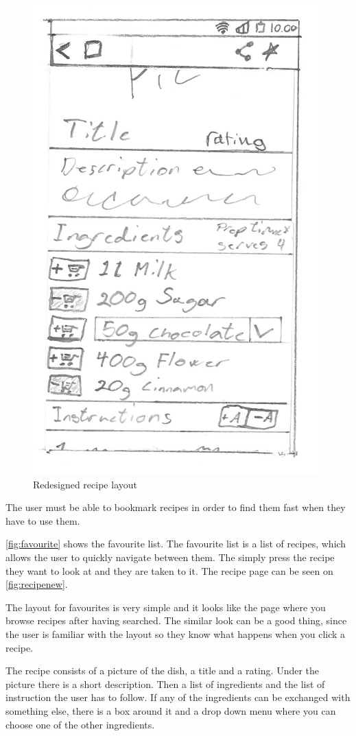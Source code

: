 \begin{figure}[H]
\begin{minipage}[b]{0.5\columnwidth}
\includegraphics[width=0.735\columnwidth]{../img/prototypes/recipe_new.pdf}
\caption{Redesigned recipe layout\label{fig:recipenew}}
\end{minipage}
\end{figure}

The user must be able to bookmark recipes in order to find them fast when they have to use them.

\autoref{fig:favourite} shows the favourite list. The favourite list is a list of recipes, which allows the user to quickly navigate between them. The simply press the recipe they want to look at and they are taken to it. The recipe page can be seen on \autoref{fig:recipenew}. 

The layout for favourites is very simple and it looks like the page where you browse recipes after having searched. The similar look can be a good thing, since the user is familiar with the layout so they know what happens when you click a recipe.

The recipe consists of a picture of the dish, a title and a rating. Under the picture there is a short description. Then a list of ingredients and the list of instruction the user has to follow. If any of the ingredients can be exchanged with something else, there is a box around it and a drop down menu where you can choose one of the other ingredients.

